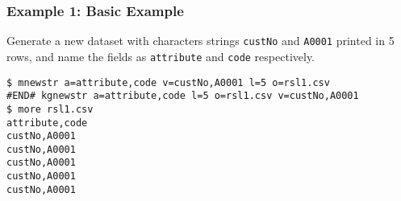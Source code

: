 \subsubsection*{Example 1: Basic Example}

Generate a new dataset with characters strings \verb|custNo| and \verb|A0001| printed in 5 rows, and name the fields as \verb|attribute| and \verb|code| respectively.


\begin{Verbatim}[baselinestretch=0.7,frame=single]
$ mnewstr a=attribute,code v=custNo,A0001 l=5 o=rsl1.csv
#END# kgnewstr a=attribute,code l=5 o=rsl1.csv v=custNo,A0001
$ more rsl1.csv
attribute,code
custNo,A0001
custNo,A0001
custNo,A0001
custNo,A0001
custNo,A0001
\end{Verbatim}

